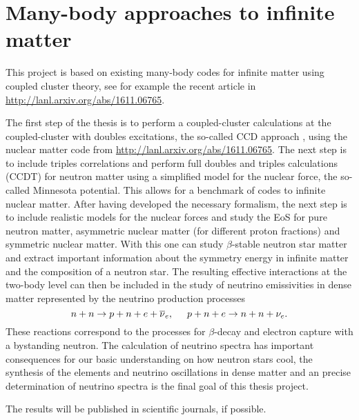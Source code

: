 \documentclass[aps,prc,twocolumn,showpacs,floatfix,nofootinbib,preprintnumbers,superscriptaddress,amsmath,amssymb]{revtex4-1}
\begin{document}
\section*{Many-body approaches to infinite matter}

This project is based on existing many-body codes for infinite matter using coupled cluster theory, see
for example the recent article in \url{http://lanl.arxiv.org/abs/1611.06765}. 

The first step of the thesis is to perform a coupled-cluster calculations at the
coupled-cluster with doubles excitations, the so-called CCD approach \cite{shavittbartlett2009}, using the nuclear matter code from \url{http://lanl.arxiv.org/abs/1611.06765}.  The next step
is to include triples correlations and perform full doubles and
triples calculations (CCDT) for neutron matter using a simplified model for the nuclear force, the so-called Minnesota potential. 
This allows for a benchmark of codes to infinite nuclear matter. After having developed the necessary formalism, the next step 
 is to include realistic models for the nuclear forces and 
study the EoS for pure neutron matter, asymmetric
nuclear matter (for different proton fractions) and symmetric nuclear
matter. With this one can study $\beta$-stable neutron star matter and
extract important information about the symmetry energy in infinite
matter and the composition of a neutron star. 
The resulting effective interactions at the two-body level can then be included in the study of neutrino emissivities in dense matter represented by the neutrino production processes 
\begin{equation}
    n+n\rightarrow p+n +e +\overline{\nu}_e,
    \hspace{0.5cm} p+n+e \rightarrow
    n+n+\nu_e .
    \label{eq:ind_neutr}
\end{equation}
These reactions correspond to the processes for 
$\beta$-decay and electron capture with a bystanding neutron.
The calculation of neutrino spectra has important consequences for our basic understanding on how neutron stars cool, the synthesis of the elements and neutrino oscillations in dense matter and an precise determination of neutrino spectra is the final goal of this thesis project.


The results will be published in scientific journals, if possible.
\end{document}
